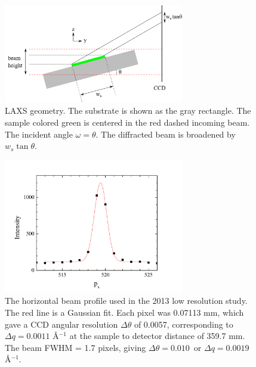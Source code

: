 \begin{figure}[htbp]
  \centering
  \includegraphics[width=0.7\textwidth]{figures/ripple/MMs/laxs/LAXS_broadening}
  \caption[LAXS geometry]
  {LAXS geometry. The substrate is shown as the gray rectangle.
  The sample colored green is centered in the red dashed incoming beam.
  The incident angle $\omega=\theta$. The diffracted beam is broadened by 
  $w_s\tan\theta$.}
  \label{fig:LAXS_broadening}
\end{figure}

\begin{figure}[p]
  \centering
  \includegraphics[width=0.7\textwidth]{figures/ripple/MMs/laxs/beamx_lr}
  \caption[The horizontal beam profile used in the 2013 low resolution study]
  {The horizontal beam profile used in the 2013 low resolution study.
  The red line is a Gaussian fit.
  Each pixel was 0.07113 mm, which gave a CCD angular resolution $\Delta\theta$ of 
  0.0057\textdegree, corresponding to $\Delta q=0.0011$ \AA$^{-1}$ at the 
  sample to detector distance of 359.7 mm. 
  The beam FWHM = 1.7 pixels, giving $\Delta\theta = 0.010$\textdegree\ or
  $\Delta q= 0.0019$ \AA$^{-1}$.}
  \label{fig:ripple_lr_beamx}
\end{figure}

